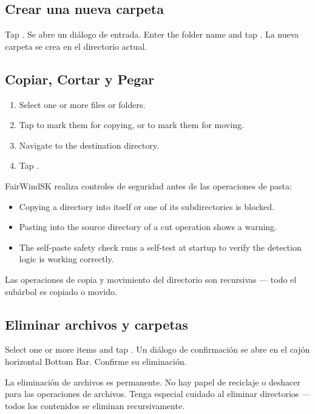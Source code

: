\subsection{Crear una nueva carpeta}

Tap .
Se abre un diálogo de entrada.
Enter the folder name and tap .
La nueva carpeta se crea en el directorio actual.

\subsection{Copiar, Cortar y Pegar}

\begin{enumerate}
  \item Select one or more files or folders.
  \item Tap  to mark them for copying, or  to mark them for moving.
  \item Navigate to the destination directory.
  \item Tap .
\end{enumerate}

FairWindSK realiza controles de seguridad antes de las operaciones de pasta:

\begin{itemize}
  \item Copying a directory into itself or one of its subdirectories is blocked.
  \item Pasting into the source directory of a cut operation shows a warning.
  \item The self-paste safety check runs a self-test at startup to verify the detection logic is working correctly.
\end{itemize}

Las operaciones de copia y movimiento del directorio son recursivas --- todo el subárbol es copiado o movido.

\subsection{Eliminar archivos y carpetas}

Select one or more items and tap .
Un diálogo de confirmación se abre en el cajón horizontal Bottom Bar.
Confirme su eliminación.

\begin{warningbox}
La eliminación de archivos es permanente.
No hay papel de reciclaje o deshacer para las operaciones de archivos.
Tenga especial cuidado al eliminar directorios --- todos los contenidos se eliminan recursivamente.
\end{warningbox}

